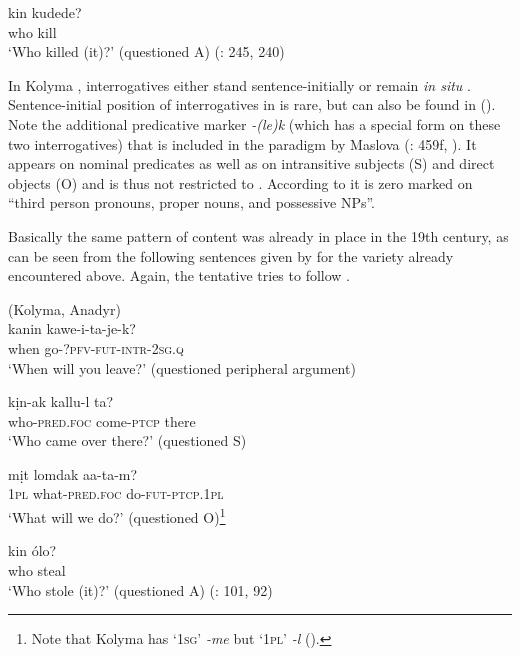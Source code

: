     \ex
    \gll kin kudede?\\
    who  kill\\
    \glt ‘Who killed (it)?’ (questioned A) (\citealt{Nagasaki2011}: 245, 240)\z\z
 
In Kolyma , interrogatives either stand sentence-initially or remain \textit{in situ} \citep[481]{Maslova2003a}. Sentence-initial position of interrogatives in  is rare, but can also be found in  (). Note the additional predicative  marker \textit{-(le)k} (which has a special form on these two interrogatives) that is included in the  par\-a\-digm by Maslova (\citeyear{Maslova1997}: 459f, \citeyear[88]{Maslova2003a}). It appears on nominal predicates as well as on intransitive subjects (S) and direct objects (O) and is thus not restricted to  \citep[227]{Nagasaki2011}. According to \citet[459]{Maslova1997} it is zero marked on “third person pronouns, proper nouns, and possessive NPs”.

Basically the same pattern of content  was already in place in the 19th century, as can be seen from the following sentences given by \citet{Schiefner1871} for the variety already encountered above. Again, the tentative  tries to follow \citet{Maslova2003a}.

\ea%
    \label{ex:yuka:11}
     (Kolyma, Anadyr)\\
    \ea
    \gll kanin kawe-i-ta-je-{k}?\\
    when    go-?\textsc{pfv}-\textsc{fut}-\textsc{intr}-2\textsc{sg.q}\\
    \glt ‘When will you leave?’ (questioned peripheral argument)
    
    \ex
    \gll kịn{-ak} kallu-{l} ta?\\
    who-\textsc{pred.foc}    come-\textsc{ptcp}  there\\
    \glt ‘Who came over there?’ (questioned S)
    
    \ex
    \gll mịt lom{dak} aa-ta-{m}?\\
    \textsc{1pl}  what-\textsc{pred.foc}  do-\textsc{fut}-\textsc{ptcp}.\textsc{1pl}\\
    \glt ‘What will we do?’ (questioned O)\footnote{Note that Kolyma  has ‘1\textsc{sg’} \textit{-me} but ‘1\textsc{pl’} \textit{-l} ().}
    
    \ex
    \gll kin ólo?\\
    who  steal\\
    \glt ‘Who stole (it)?’ (questioned A) (\citealt{Schiefner1871}: 101, 92)\z\z

